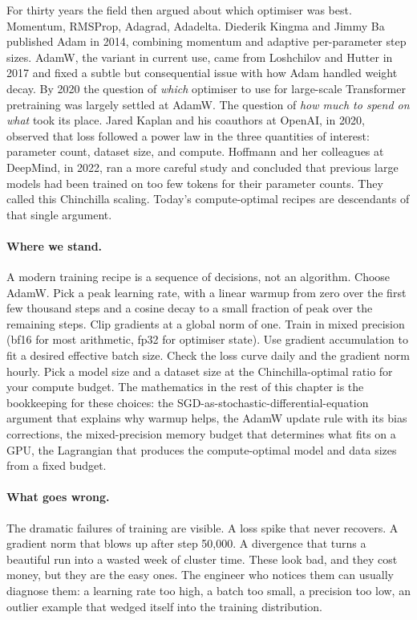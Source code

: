 For thirty years the field then argued about which optimiser was
best. Momentum, RMSProp, Adagrad, Adadelta. Diederik Kingma and
Jimmy Ba published Adam in 2014, combining momentum and adaptive
per-parameter step sizes. AdamW, the variant in current use, came
from Loshchilov and Hutter in 2017 and fixed a subtle but
consequential issue with how Adam handled weight decay. By 2020
the question of \emph{which} optimiser to use for large-scale
Transformer pretraining was largely settled at AdamW. The
question of \emph{how much to spend on what} took its place. Jared
Kaplan and his coauthors at OpenAI, in 2020, observed that loss
followed a power law in the three quantities of interest:
parameter count, dataset size, and compute. Hoffmann and her
colleagues at DeepMind, in 2022, ran a more careful study and
concluded that previous large models had been trained on too few
tokens for their parameter counts. They called this Chinchilla
scaling. Today's compute-optimal recipes are descendants of that
single argument.

\paragraph{Where we stand.} A modern training recipe is a
sequence of decisions, not an algorithm. Choose AdamW. Pick a
peak learning rate, with a linear warmup from zero over the first
few thousand steps and a cosine decay to a small fraction of peak
over the remaining steps. Clip gradients at a global norm of one.
Train in mixed precision (bf16 for most arithmetic, fp32 for
optimiser state). Use gradient accumulation to fit a desired
effective batch size. Check the loss curve daily and the gradient
norm hourly. Pick a model size and a dataset size at the
Chinchilla-optimal ratio for your compute budget. The mathematics
in the rest of this chapter is the bookkeeping for these choices:
the SGD-as-stochastic-differential-equation argument that
explains why warmup helps, the AdamW update rule with its bias
corrections, the mixed-precision memory budget that determines
what fits on a GPU, the Lagrangian that produces the
compute-optimal model and data sizes from a fixed budget.

\paragraph{What goes wrong.} The dramatic failures of training
are visible. A loss spike that never recovers. A gradient norm
that blows up after step 50,000. A divergence that turns a
beautiful run into a wasted week of cluster time. These look bad,
and they cost money, but they are the easy ones. The engineer
who notices them can usually diagnose them: a learning rate too
high, a batch too small, a precision too low, an outlier example
that wedged itself into the training distribution.

